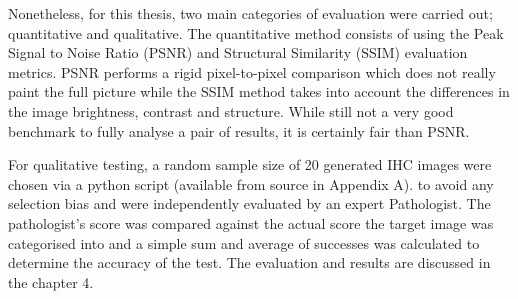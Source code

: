 Nonetheless, for this thesis, two main categories of evaluation were carried out; quantitative and qualitative. The quantitative method consists of using the Peak Signal to Noise Ratio (PSNR) and Structural Similarity (SSIM) evaluation metrics. PSNR performs a rigid pixel-to-pixel comparison which does not really paint the full picture while the SSIM method takes into account the differences in the image brightness, contrast and structure. While still not a very good benchmark to fully analyse a pair of results, it is certainly fair than PSNR.

For qualitative testing, a random sample size of 20 generated IHC images were chosen via a python script (available from source in Appendix A). to avoid any selection bias and were independently evaluated by an expert Pathologist. The pathologist's score was compared against the actual score the target image was categorised into and a simple sum and average of successes was calculated to determine the accuracy of the test. The evaluation and results are discussed in the chapter 4.

